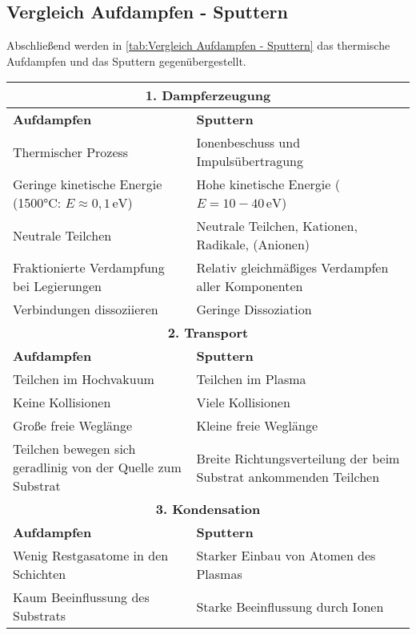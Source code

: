 \documentclass{article} %
\begin{document}
\vspace{1em}
\subsection{Vergleich Aufdampfen - Sputtern}
Abschließend werden in \autoref{tab:Vergleich Aufdampfen - Sputtern} das thermische Aufdampfen und das Sputtern gegenübergestellt.

\begin{table}[htb!]
    \centering
    \renewcommand{\arraystretch}{1.5} %
    \begin{tabular}{|p{6cm}|p{6cm}|}
        \hline
        \multicolumn{2}{|c|}{\textbf{1. Dampferzeugung}} \\ \hline
        \textbf{Aufdampfen} & \textbf{Sputtern} \\ \hline
        Thermischer Prozess & Ionenbeschuss und Impulsübertragung \\
        Geringe kinetische Energie (1500°C: $E \approx 0,1 \, \mathrm{eV}$) & Hohe kinetische Energie ($E = 10 - 40 \, \mathrm{eV}$) \\
        Neutrale Teilchen & Neutrale Teilchen, Kationen, Radikale, (Anionen) \\
        Fraktionierte Verdampfung bei Legierungen & Relativ gleichmäßiges Verdampfen aller Komponenten \\
        Verbindungen dissoziieren & Geringe Dissoziation \\ \hline
        \multicolumn{2}{|c|}{\textbf{2. Transport}} \\ \hline
        \textbf{Aufdampfen} & \textbf{Sputtern} \\ \hline
        Teilchen im Hochvakuum & Teilchen im Plasma \\
        Keine Kollisionen & Viele Kollisionen \\
        Große freie Weglänge & Kleine freie Weglänge \\
        Teilchen bewegen sich geradlinig von der Quelle zum Substrat & Breite Richtungsverteilung der beim Substrat ankommenden Teilchen \\ \hline
        \multicolumn{2}{|c|}{\textbf{3. Kondensation}} \\ \hline
        \textbf{Aufdampfen} & \textbf{Sputtern} \\ \hline
        Wenig Restgasatome in den Schichten & Starker Einbau von Atomen des Plasmas \\
        Kaum Beeinflussung des Substrats & Starke Beeinflussung durch Ionen \\

\end{tabular}
\end{table}
\end{document}
